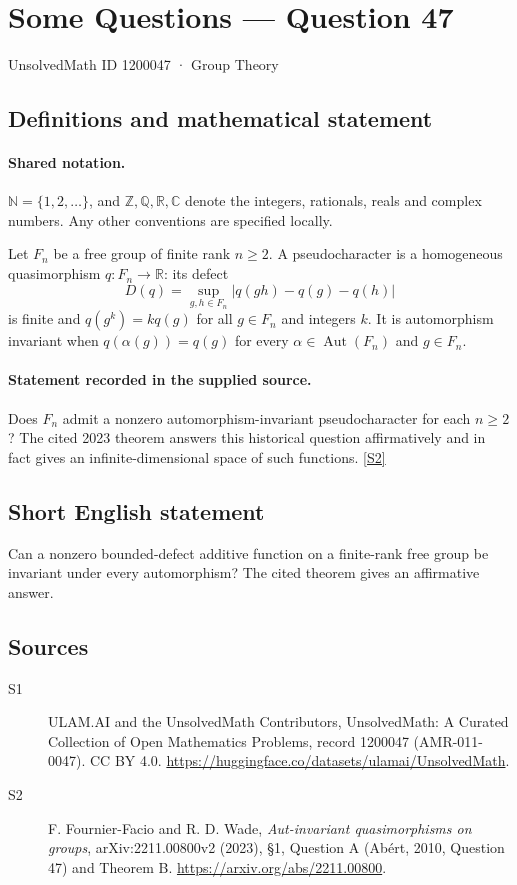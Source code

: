 \documentclass[11pt]{article}
\newcommand{\sref}[2]{\hyperlink{source:#1:#2}{[S#2]}}
\begin{document}
\setcounter{section}{1200046}
\section{Some Questions — Question 47}\label{1200047}
{\small\sffamily UnsolvedMath ID 1200047 · Group Theory}
\subsection{Definitions and mathematical statement}

\paragraph{Shared notation.}$\mathbb N=\{1,2,\ldots\}$, and $\mathbb Z,\mathbb Q,\mathbb R,\mathbb C$ denote the integers, rationals, reals and complex numbers. Any other conventions are specified locally.


Let $F_n$ be a free group of finite rank $n\geq2$. A pseudocharacter is a homogeneous quasimorphism $q:F_n\to\mathbb R$: its defect
\[D(q)=\sup_{g,h\in F_n}|q(gh)-q(g)-q(h)|
\]
is finite and $q(g^k)=kq(g)$ for all $g\in F_n$ and integers $k$. It is automorphism invariant when $q(\alpha(g))=q(g)$ for every $\alpha\in\operatorname{Aut}(F_n)$ and $g\in F_n$.
\paragraph{Statement recorded in the supplied source.}
Does $F_n$ admit a nonzero automorphism-invariant pseudocharacter for each $n\geq2$? The cited 2023 theorem answers this historical question affirmatively and in fact gives an infinite-dimensional space of such functions. \sref{1200047}{2}
\subsection{Short English statement}
Can a nonzero bounded-defect additive function on a finite-rank free group be invariant under every automorphism? The cited theorem gives an affirmative answer.
\subsection{Sources}
\begin{description}
\item[\hypertarget{source:1200047:1}{S1}] ULAM.AI and the UnsolvedMath Contributors, UnsolvedMath: A Curated Collection of Open Mathematics Problems, record 1200047 (AMR-011-0047). CC BY 4.0. \url{https://huggingface.co/datasets/ulamai/UnsolvedMath}.
\item[\hypertarget{source:1200047:2}{S2}] F. Fournier-Facio and R. D. Wade, \emph{Aut-invariant quasimorphisms on groups}, arXiv:2211.00800v2 (2023), §1, Question A (Abért, 2010, Question 47) and Theorem B. \url{https://arxiv.org/abs/2211.00800}.
\end{description}
\label{end:1200047}
\end{document}
